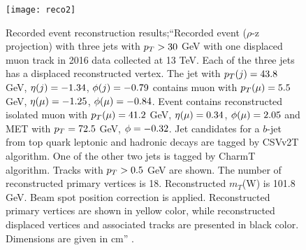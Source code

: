 \begin{figure}[!h]
  \centering
  \texttt{[image: reco2]}
  \caption[Recorded event reconstruction.]{Recorded event reconstruction results;``Recorded event ($\rho$-z projection) with three jets with $p_T>30$ GeV with one displaced muon track in 2016 data collected at 13 TeV. Each of the three jets has a displaced reconstructed vertex. The jet with $p_T(j)=43.8$ GeV, $\eta(j)=-1.34$, $\phi(j)=-0.79$ contains muon with $p_T(\mu)=5.5$ GeV, $\eta(\mu)=-1.25$, $\phi(\mu)=-0.84$. Event contains reconstructed isolated muon with $p_T(\mu)=41.2$ GeV, $\eta(\mu)=0.34$, $\phi(\mu)=2.05$ and MET with $p_T=72.5$ GeV, $\phi=-0.32$. Jet candidates for a $b$-jet from top quark leptonic and hadronic decays are tagged by CSVv2T algorithm. One of the other two jets is tagged by CharmT algorithm. Tracks with $p_T>0.5$ GeV are shown. The number of reconstructed primary vertices is 18. Reconstructed $m_T$(W) is 101.8 GeV. Beam spot position correction is applied. Reconstructed primary vertices are shown in yellow color, while reconstructed displaced vertices and associated tracks are presented in black color. Dimensions are given in cm'' \cite{reco1}.}\label{fig:reco3}
\end{figure}

